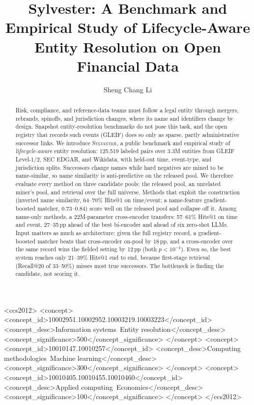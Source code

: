\documentclass[sigconf]{acmart}
\begin{document}
\title{Sylvester: A Benchmark and Empirical Study of
  Lifecycle-Aware Entity Resolution on Open Financial Data}
\author{Sheng Chang Li}

\renewcommand{\shortauthors}{Li}

\begin{abstract}
Risk, compliance, and reference-data teams must follow a legal
entity through mergers, rebrands, spinoffs, and jurisdiction
changes, where its name and identifiers change by design. Snapshot
entity-resolution benchmarks do not pose this task, and the open
registry that records such events (GLEIF) does so only as sparse,
partly administrative successor links. We introduce
\textsc{Sylvester}, a public benchmark and empirical study of
\emph{lifecycle-aware} entity resolution: 125{,}519 labeled pairs
over 3.3M entities from GLEIF Level-1/2, SEC EDGAR, and Wikidata,
with held-out time, event-type, and jurisdiction splits.
Successors change names while hard negatives are mined to be
name-similar, so name similarity is anti-predictive on the released
pool. We therefore evaluate every method on three candidate pools:
the released pool, an unrelated miner's pool, and retrieval over
the full universe. Methods that exploit the construction (inverted
name similarity, 64--70\% Hits@1 on time/event; a name-feature
gradient-boosted matcher, 0.73--0.84) score well on the released
pool and collapse off it. Among name-only methods, a 22M-parameter
cross-encoder transfers: 57--61\% Hits@1 on time and event,
27--35\,pp ahead of the best bi-encoder and ahead of six zero-shot
LLMs. Input matters as much as architecture: given the full registry record, a gradient-boosted
matcher beats that cross-encoder on-pool by 18\,pp, and a
cross-encoder over the same record wins the fielded setting by
12\,pp (both $p<10^{-4}$). Even so, the best system reaches only
21--39\% Hits@1 end to end, because first-stage retrieval
(Recall@20 of 33--50\%) misses most true successors. The
bottleneck is finding the candidate, not scoring it.
\end{abstract}

\begin{CCSXML}
<ccs2012>
<concept>
<concept_id>10002951.10002952.10003219.10003223</concept_id>
<concept_desc>Information systems~Entity resolution</concept_desc>
<concept_significance>500</concept_significance>
</concept>
<concept>
<concept_id>10010147.10010257</concept_id>
<concept_desc>Computing methodologies~Machine learning</concept_desc>
<concept_significance>300</concept_significance>
</concept>
<concept>
<concept_id>10010405.10010455.10010460</concept_id>
<concept_desc>Applied computing~Economics</concept_desc>
<concept_significance>100</concept_significance>
</concept>
</ccs2012>
\end{CCSXML}
\end{document}
